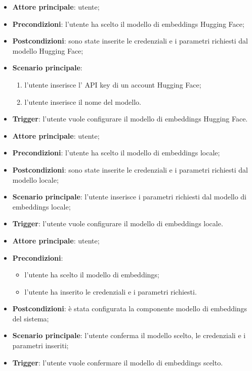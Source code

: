 \documentclass[10pt, a4paper]{article}
\begin{document}
    \begin{itemize}
        \item \textbf{Attore principale}: utente;
        \item \textbf{Precondizioni}: l’utente ha scelto il modello di embeddings Hugging Face;
        \item \textbf{Postcondizioni}: sono state inserite le credenziali e i parametri richiesti dal modello Hugging Face;
        \item \textbf{Scenario principale}:
            \begin{enumerate}
                \item l’utente inserisce l’ API key di un account Hugging Face;
                \item l’utente inserisce il nome del modello.
            \end{enumerate}
        \item \textbf{Trigger}: l’utente vuole configurare il modello di embeddings Hugging Face.
    \end{itemize}

    \begin{itemize}
        \item \textbf{Attore principale}: utente;
        \item \textbf{Precondizioni}: l’utente ha scelto il modello di embeddings locale;
        \item \textbf{Postcondizioni}: sono state inserite le credenziali e i parametri richiesti dal modello locale;
        \item \textbf{Scenario principale}: l’utente inserisce i parametri richiesti dal modello di embeddings locale;
        \item \textbf{Trigger}: l’utente vuole configurare il modello di embeddings locale.
    \end{itemize}

    \begin{itemize}
        \item \textbf{Attore principale}: utente;
        \item \textbf{Precondizioni}:
            \begin{itemize}
                \item l’utente ha scelto il modello di embeddings;
                \item l’utente ha inserito le credenziali e i parametri richiesti.
            \end{itemize}
        \item \textbf{Postcondizioni}: è stata configurata la componente modello di embeddings del sistema;
        \item \textbf{Scenario principale}: l’utente conferma il modello scelto, le credenziali e i parametri inseriti;
        \item \textbf{Trigger}: l’utente vuole confermare il modello di embeddings scelto.
    \end{itemize}
\end{document}
